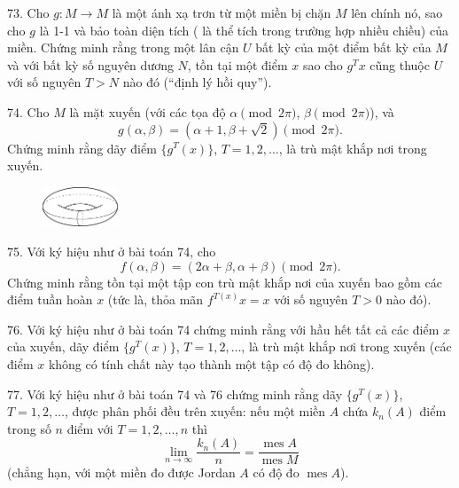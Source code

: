 \begin{problem}{73.}
	Cho $g\colon M \to M$ là một ánh xạ trơn từ một miền bị chặn $M$ lên chính nó, sao cho $g$ là 1-1 và bảo toàn diện tích ( là thể tích trong trường hợp nhiều chiều) của miền. Chứng minh rằng trong một lân cận $U$ bất kỳ của một điểm bất kỳ của $M$ và với bất kỳ số nguyên dương $N$, tồn tại một điểm $x$ sao cho $g^T x$ cũng thuộc $U$ với số nguyên $T>N$ nào đó (\enquote{định lý hồi quy}).
\end{problem}

\begin{problem}{74.}
	Cho $M$ là mặt xuyến (với các tọa độ $\alpha \pmod{2\pi}$, $\beta \pmod{2\pi}$), và
	\begin{equation*}
		g(\alpha, \beta)=(\alpha+1, \beta+ \sqrt{2}) \pmod{2\pi}.
	\end{equation*}
	Chứng minh rằng dãy điểm $\{g^T (x)\}$, $T=1, 2, \dotsc$, là trù mật khắp nơi trong xuyến.
	\begin{figure}
		\includegraphics[width=0.2\textwidth]{74_torus}
	\end{figure}
\end{problem}

\begin{problem}{75.}
	Với ký hiệu như ở bài toán 74, cho
	\begin{equation*}
		f(\alpha, \beta)=(2\alpha+\beta,\alpha+\beta) \pmod{2\pi}.
	\end{equation*}
	Chứng minh rằng tồn tại một tập con trù mật khắp nơi của xuyến bao gồm các điểm tuần hoàn $x$ (tức là, thỏa mãn $f^{T(x)} x=x$ với số nguyên $T>0$ nào đó).
\end{problem}

\begin{problem}{76.}
	Với ký hiệu như ở bài toán 74 chứng minh rằng với hầu hết tất cả các điểm $x$ của xuyến, dãy điểm $\{g^T (x)\}$, $T=1, 2, \dotsc$, là trù mật khắp nơi trong xuyến (các điểm $x$ không có tính chất này tạo thành một tập có độ đo không).
\end{problem}

\begin{problem}{77.}
	Với ký hiệu như ở bài toán 74 và 76 chứng minh rằng dãy $\{g^T(x)\}$, $T=1, 2, \dotsc$, được phân phối đều trên xuyến: nếu một miền $A$ chứa $k_n(A)$ điểm trong số $n$ điểm với $T=1, 2, \dotsc, n$ thì
	\begin{equation*}
		\lim_{n \to \infty} \frac{k_n(A)}{n}=\frac{\operatorname{mes} A}{\operatorname{mes} M}
	\end{equation*}
	(chẳng hạn, với một miền đo được Jordan $A$ có độ đo $\operatorname{mes} A$).
\end{problem}

